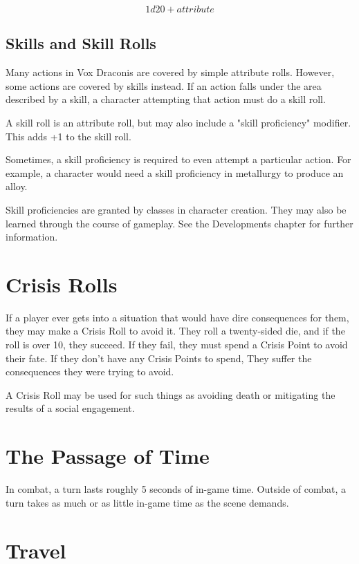 \begin{multicols}{2}
$$1d20 + attribute$$

\subsection{Skills and Skill Rolls}

Many actions in Vox Draconis are covered by simple attribute
rolls. However, some actions are covered by skills instead.
If an action falls under the area described by a skill, a
character attempting that action must do a skill roll.

A skill roll is an attribute roll, but may also include a "skill
proficiency" modifier. This adds +1 to the skill roll.

Sometimes, a skill proficiency is required to even attempt a
particular action. For example, a character would need a skill
proficiency in metallurgy to produce an alloy.

Skill proficiencies are granted by classes in character creation.
They may also be learned through the course of gameplay. See
the Developments chapter for further information.

\section{Crisis Rolls}

If a player ever gets into a situation that would have dire
consequences for them, they may make a Crisis Roll to avoid it.
They roll a twenty-sided die, and if the roll is over 10, they
succeed. If they fail, they must spend a Crisis Point to avoid
their fate. If they don't have any Crisis Points to spend, They
suffer the consequences they were trying to avoid.

A Crisis Roll may be used for such things as avoiding death or
mitigating the results of a social engagement.

\section{The Passage of Time}

In combat, a turn lasts roughly 5 seconds of in-game time. Outside
of combat, a turn takes as much or as little in-game time as the
scene demands.

\section{Travel} 


\end{multicols}

